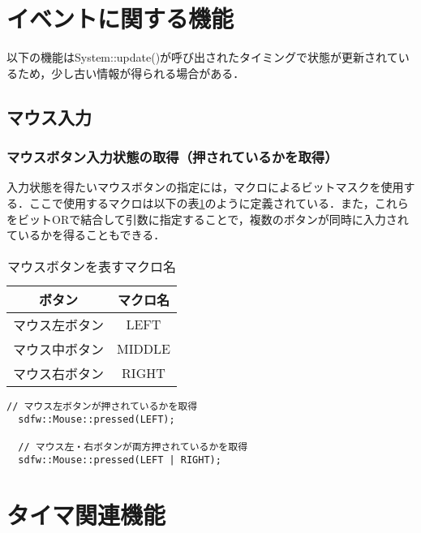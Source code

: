 \documentclass[a4paper, 11pt, oneside, onecolumn, openany]{jsarticle}
\begin{document}
\section{イベントに関する機能}
以下の機能はSystem::update()が呼び出されたタイミングで状態が更新されているため，少し古い情報が得られる場合がある．
\subsection{マウス入力}
\subsubsection{マウスボタン入力状態の取得（押されているかを取得）}
入力状態を得たいマウスボタンの指定には，マクロによるビットマスクを使用する．ここで使用するマクロは以下の表\ref{macro-MouseButton}のように定義されている．また，これらをビットORで結合して引数に指定することで，複数のボタンが同時に入力されているかを得ることもできる．
\begin{table}[H]
  \caption{マウスボタンを表すマクロ名}
  \label{macro-MouseButton}
  \centering
  \begin{tabular}{cc}
    \hline
    ボタン & マクロ名 \\
    \hline \hline
    マウス左ボタン & LEFT \\
    マウス中ボタン & MIDDLE \\
    マウス右ボタン & RIGHT \\
    \hline
  \end{tabular}
\end{table}

\begin{lstlisting}[caption=使用例, label=macro-GetMouseButtonState, keepspaces=true]
  // マウス左ボタンが押されているかを取得
  sdfw::Mouse::pressed(LEFT);

  // マウス左・右ボタンが両方押されているかを取得
  sdfw::Mouse::pressed(LEFT | RIGHT);
\end{lstlisting}


\section{タイマ関連機能}
\end{document}
